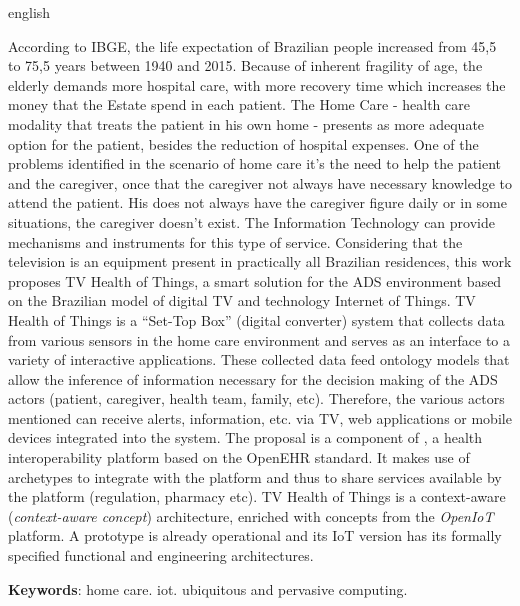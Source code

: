 \begin{resumo}[Abstract]
 \begin{otherlanguage*}{english}

According to IBGE, the life expectation of Brazilian people increased from
45,5 to 75,5 years between 1940 and 2015. Because of inherent fragility
of age, the elderly demands more hospital care, with more recovery time
which increases the money that the Estate spend in each patient. The
Home Care - health care modality that treats the patient in his own
home - presents as more adequate option for the patient, besides the
reduction of hospital expenses. One of the problems identified in the
scenario of home care it's the need to help the patient and the caregiver,
once that the caregiver not always have necessary knowledge to attend
the patient. His does not always have the caregiver figure daily or in
some situations, the caregiver doesn't exist. The Information Technology
can provide mechanisms and instruments for this type of service.
Considering that the television is an equipment present in practically all
Brazilian residences, this work proposes TV Health of Things, a smart
solution for the ADS environment based on the Brazilian model of digital TV
and technology Internet of Things. TV Health of Things is a ``Set-Top Box''
(digital converter) system that collects data from various sensors in the
home care environment and serves as an interface to a variety of interactive
applications. These collected data feed ontology models that allow the
inference of information necessary for the decision making of the ADS actors
(patient, caregiver, health team, family, etc). Therefore, the various actors
mentioned can receive alerts, information, etc. via TV, web applications or 
mobile devices integrated into the system. The proposal is a component of 
\nextsaude[], a health interoperability platform based on the OpenEHR
standard. It makes use of archetypes to integrate with the \nextsaude[] platform
and thus to share services available by the platform (regulation, pharmacy
etc). TV Health of Things is a context-aware (\textit{context-aware concept}) 
architecture, enriched with concepts from the \textit {OpenIoT} platform. 
A prototype is already operational and its IoT version has its formally 
specified functional and engineering architectures.


\textbf{Keywords}: home care. iot. ubiquitous and pervasive computing.
 \end{otherlanguage*}
\end{resumo}
